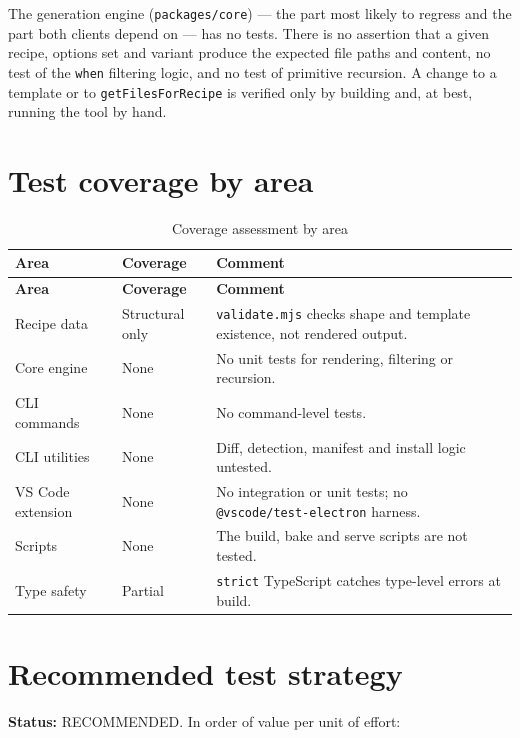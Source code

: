 The generation engine (\texttt{packages/core}) --- the part most likely to
regress and the part both clients depend on --- has no tests. There is no
assertion that a given recipe, options set and variant produce the expected
file paths and content, no test of the \texttt{when} filtering logic, and no
test of primitive recursion. A change to a template or to
\texttt{getFilesForRecipe} is verified only by building and, at best, running the
tool by hand.

\section{Test coverage by area}

\begin{longtable}{@{}L{4cm}L{2.6cm}L{7.6cm}@{}}
\caption{Coverage assessment by area}\\
\toprule
\textbf{Area} & \textbf{Coverage} & \textbf{Comment} \\
\midrule
\endfirsthead
\toprule
\textbf{Area} & \textbf{Coverage} & \textbf{Comment} \\
\midrule
\endhead
Recipe data & Structural only & \texttt{validate.mjs} checks shape and template
existence, not rendered output. \\
Core engine & None & No unit tests for rendering, filtering or recursion. \\
CLI commands & None & No command-level tests. \\
CLI utilities & None & Diff, detection, manifest and install logic untested. \\
VS Code extension & None & No integration or unit tests; no
\texttt{@vscode/test-electron} harness. \\
Scripts & None & The build, bake and serve scripts are not tested. \\
Type safety & Partial & \texttt{strict} TypeScript catches type-level errors at
build. \\
\bottomrule
\end{longtable}

\section{Recommended test strategy}

\textbf{Status:} RECOMMENDED. In order of value per unit of effort:

